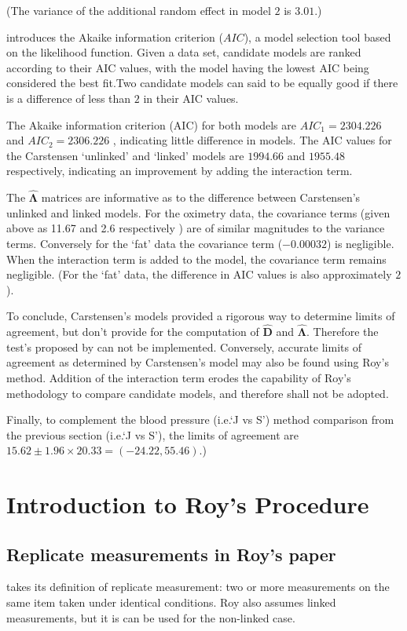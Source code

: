 \documentclass[12pt, a4paper]{report}
\theoremstyle{plain}
\theoremstyle{definition}
\theoremstyle{remark}
\begin{document}
\noindent (The variance of the additional random effect in model $2$ is $3.01$.)

\citet{akaike} introduces the Akaike information criterion ($AIC$), a model
selection tool based on the likelihood function. Given a data set, candidate models
are ranked according to their AIC values, with the model having the lowest AIC being considered the best fit.Two candidate models can said to be equally good if there is a difference of less than $2$ in their AIC values.

The Akaike information criterion (AIC) for both models are $AIC_{1} = 2304.226$ and $AIC_{2} = 2306.226$ , indicating little difference in models. The AIC values for the Carstensen `unlinked' and `linked' models are $1994.66$ and $1955.48$ respectively, indicating an improvement by adding the interaction term.

The $\boldsymbol{\hat{\Lambda}}$ matrices are informative as to the difference between Carstensen's unlinked and linked models. For the oximetry data, the covariance terms (given above as 11.67 and 2.6 respectively ) are of similar magnitudes to the variance terms. Conversely for the `fat' data the covariance term ($-0.00032$) is negligible. When the interaction term is added to the model, the covariance term remains negligible. (For the `fat' data, the difference in AIC values is also approximately $2$).

To conclude, Carstensen's models provided a rigorous way to determine limits of agreement, but don't provide for the computation of $\boldsymbol{\hat{D}}$ and $\boldsymbol{\hat{\Lambda}}$. Therefore the test's proposed by \citet{roy} can not be implemented. Conversely, accurate limits of agreement as determined by Carstensen's model may also be found using Roy's method. Addition of the interaction term erodes the capability of Roy's methodology to compare candidate models, and therefore shall not be adopted.

Finally, to complement the blood pressure (i.e.`J vs S') method comparison from the previous section (i.e.`J vs S'), the limits of agreement are $15.62 \pm 1.96 \times 20.33 = (-24.22, 55.46)$.)


\chapter{Introduction to Roy's Procedure}

\section{Replicate measurements in Roy's paper}
\citet{ARoy2009} takes its definition of replicate measurement: two or more measurements on the same item taken
under identical conditions. Roy also assumes linked measurements, but it is can be used for the non-linked case.
\end{document}
